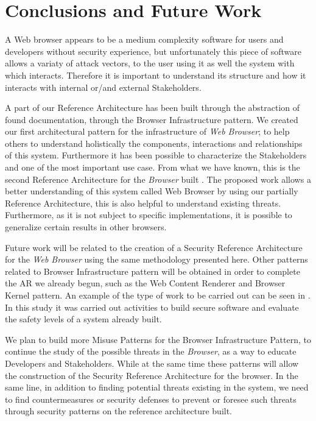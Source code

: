 \documentclass{sig-alternate-05-2015}
\begin{document}
\section*{Conclusions and Future Work}
A Web browser appears to be a medium complexity software for users and developers without security experience, but unfortunately this piece of software allows a variaty of attack vectors, to the user using it as well the system with which interacts. Therefore it is important to understand its structure and how it interacts with internal or/and external Stakeholders.

A part of our Reference Architecture has been built through the abstraction of found documentation, through the Browser Infrastructure pattern. We created our first architectural pattern for the infrastructure of \textit{Web Browser}; to help others to understand holistically the components, interactions and relationships of this system. Furthermore it has been possible to characterize the Stakeholders and one of the most important use case. From what we have known, this is the second Reference Architecture for the \textit{Browser} built \cite{2005-grosskurth-browser-refarch}. The proposed work allows a better understanding of this system called Web Browser by using our partially Reference Architecture, this is also helpful to understand existing threats. Furthermore, as it is not subject to specific implementations, it is possible to generalize certain results in other browsers.

Future work will be related to the creation of a Security Reference Architecture for the \textit{Web Browser} using the same methodology presented here. Other patterns related to Browser Infrastructure pattern will be obtained in order to complete the AR we already begun, such as the Web Content Renderer and Browser Kernel pattern. An example of the type of work to be carried out can be seen in \cite{fernandez2014security}. In this study it was carried out activities to build secure software and evaluate the safety levels of a system already built.

We plan to build more Misuse Patterns for the Browser Infrastructure Pattern, to continue the study of the possible threats in the \textit{Browser}, as a way to educate Developers and Stakeholders. While at the same time these patterns will allow the construction of the Security Reference Architecture for the browser. In the same line, in addition to finding potential threats existing in the system, we need to find countermeasures or security defenses to prevent or foresee such threats through security patterns on the reference architecture built.

  

\end{document}
